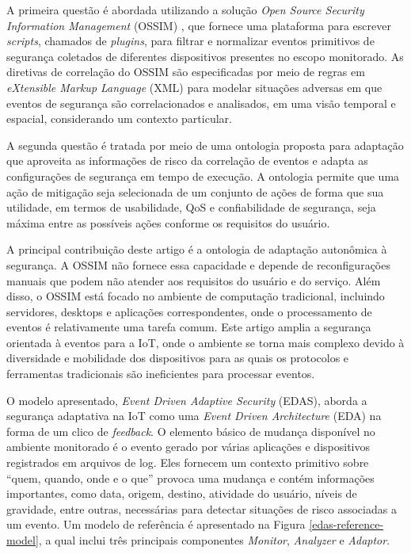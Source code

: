 \documentclass[tid,table]{texufpel} %
\begin{document}
A primeira questão é abordada utilizando a solução \textit{Open Source Security Information Management} (OSSIM) \cite{ossim18}, que fornece uma plataforma para escrever \textit{scripts}, chamados de \textit{plugins}, para filtrar e normalizar eventos primitivos de segurança coletados de diferentes dispositivos presentes no escopo monitorado. As diretivas de correlação do OSSIM são especificadas por meio de regras em \textit{eXtensible Markup Language} (XML) para modelar situações adversas em que eventos de segurança são correlacionados e analisados, em uma visão temporal e espacial, considerando um contexto particular. 


A segunda questão é tratada por meio de uma ontologia proposta para adaptação que aproveita as informações de risco da correlação de eventos e adapta as configurações de segurança em tempo de execução. A ontologia permite que uma ação de mitigação seja selecionada de um conjunto de ações de forma que sua utilidade, em termos de usabilidade, QoS e confiabilidade de segurança, seja máxima entre as possíveis ações conforme os requisitos do usuário.

A principal contribuição deste artigo é a ontologia de adaptação autonômica à segurança. A OSSIM não fornece essa capacidade e depende de reconfigurações manuais que podem não atender aos requisitos do usuário e do serviço. Além disso, o OSSIM está focado no ambiente de computação tradicional, incluindo servidores, desktops e aplicações correspondentes, onde o processamento de eventos é relativamente uma tarefa comum. Este artigo amplia a segurança orientada à eventos para a IoT, onde o ambiente se torna mais complexo devido à diversidade e mobilidade dos dispositivos para as quais os protocolos e ferramentas tradicionais são ineficientes para processar eventos.

O modelo apresentado, \textit{Event Driven Adaptive Security} (EDAS), aborda a segurança adaptativa na IoT como uma \textit{Event Driven Architecture} (EDA) na forma de um clico de \textit{feedback}. O elemento básico de mudança disponível no ambiente monitorado é o evento gerado por várias aplicações e dispositivos registrados em arquivos de log. Eles fornecem um contexto primitivo sobre ``quem, quando, onde e o que'' provoca uma mudança e contém informações importantes, como data, origem, destino, atividade do usuário, níveis de gravidade, entre outras, necessárias para detectar situações de risco associadas a um evento. Um modelo de referência é apresentado na Figura \ref{edas-reference-model}, a qual inclui três principais componentes \textit{Monitor}, \textit{Analyzer} e \textit{Adaptor}.
\end{document}
